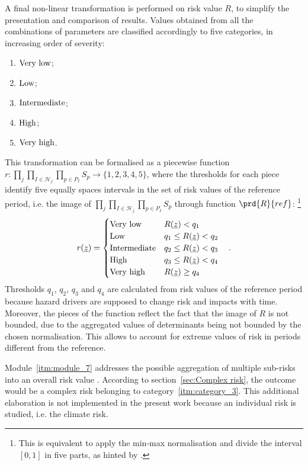 A final non-linear transformation is performed on \gls{risk} value $R$, to simplify the presentation and comparison of results.
Values obtained from all the combinations of parameters are classified accordingly to five categories, in increasing order of severity:\cite[53]{2017GIZRiskSupplement}
\begin{enumerate}
  \item $\text{Very low}$;
  \item $\text{Low}$;
  \item $\text{Intermediate}$;
  \item $\text{High}$;
  \item $\text{Very high}$.
\end{enumerate}
This transformation can be formalised as a piecewise function $r : \prod_j \prod_{I \in \mathcal{H}_j} \prod_{p \in P_I} S_p \to \{ 1, 2, 3, 4, 5 \}$, where the thresholds for each piece identify five equally spaces intervals in the set of risk values of the reference period, i.e. the image of $\prod_j \prod_{I \in \mathcal{H}_j} \prod_{p \in P_I} S_p$ through function $\prd{R}{ref}$:%
\footnote{This is equivalent to apply the min-max normalisation and divide the interval $[0, 1]$ in five parts, as hinted by \cite[74]{2017GIZVulnerabilitySourcebook}.}
\begin{equation}
  \label{eq:risk_categorical}
  r(\underline{z}) =
  \begin{cases}
    \text{Very low} & R(\underline{z}) < q_1 \\
    \text{Low} & q_1 \le R(\underline{z}) < q_2 \\
    \text{Intermediate} & q_2 \le R(\underline{z}) < q_3 \\
    \text{High} & q_3 \le R(\underline{z}) < q_4 \\
    \text{Very high} & R(\underline{z}) \ge q_4
  \end{cases}
  \quad .
\end{equation}
Thresholds $q_1$, $q_2$, $q_3$ and $q_4$ are calculated from risk values of the reference period because \gls{hazard} \glspl{driver} are supposed to change risk and \glspl{impact} with time. Moreover, the pieces of the function reflect the fact that the image of $R$ is not bounded, due to the aggregated values of \glspl{determinant} being not bounded by the chosen normalisation. This allows to account for extreme values of risk in periods different from the reference.

Module~\ref{itm:module_7} addresses the possible aggregation of multiple sub-risks into an overall \gls{risk} value \cite[54]{2017GIZRiskSupplement}. According to section~\ref{sec:Complex risk}, the outcome would be a complex risk belonging to category~\ref{itm:category_3}.
This additional elaboration is not implemented in the present work because an individual \gls{risk} is studied, i.e. the climate risk.
